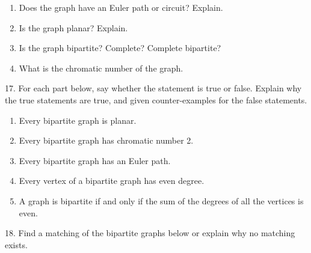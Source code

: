 \documentclass[10pt,]{book}
\theoremstyle{plain}
\theoremstyle{definition}
\theoremstyle{definition}
\theoremstyle{definition}
\numberwithin{equation}{chapter}
\begin{document}
\begin{exerciselist}
\begin{figure}
{\begin{tikzpicture}[scale=.4]
\end{tikzpicture}
}
\end{figure}
\leavevmode%
\begin{enumerate}[label=(\alph*)]
\item\hypertarget{li-1265}{}
                Does the graph have an Euler path or circuit? Explain.
\item\hypertarget{li-1266}{}
                Is the graph planar? Explain.
\item\hypertarget{li-1267}{}
                Is the graph bipartite? Complete? Complete bipartite?
\item\hypertarget{li-1268}{}
                What is the chromatic number of the graph.
\end{enumerate}
\par\smallskip
\item[17.]\hypertarget{exercise-310}{}
            For each part below, say whether the statement is true or false. Explain why the true statements are true, and given counter-examples for the false statements.
\leavevmode%
\begin{enumerate}[label=(\alph*)]
\item\hypertarget{li-1273}{}
                Every bipartite graph is planar.
\item\hypertarget{li-1274}{}
                Every bipartite graph has chromatic number 2.
\item\hypertarget{li-1275}{}
                Every bipartite graph has an Euler path.
\item\hypertarget{li-1276}{}
                Every vertex of a bipartite graph has even degree.
\item\hypertarget{li-1277}{}
                A graph is bipartite if and only if the sum of the degrees of all the vertices is even.
\end{enumerate}
\par\smallskip
\item[18.]\hypertarget{exercise-311}{}
            Find a matching of the bipartite graphs below or explain why no matching exists.
\par



\end{exerciselist}
\end{document}

